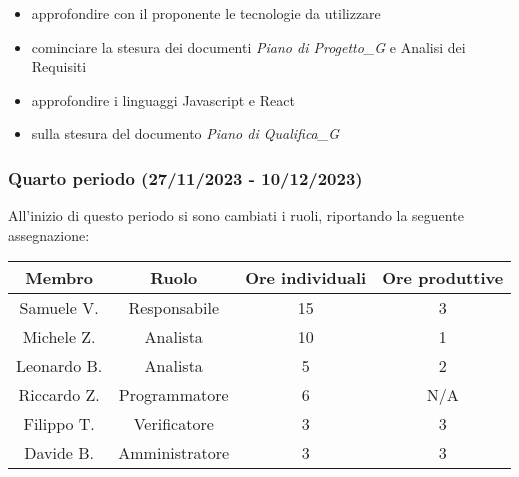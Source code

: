 \begin{itemize}
    \item approfondire con il proponente le tecnologie da utilizzare
    \item cominciare la stesura dei documenti \textit{Piano di Progetto_G} e Analisi dei Requisiti
    \item approfondire i linguaggi Javascript e React
\end{itemize}

\begin{itemize}
    \item sulla stesura del documento \textit{Piano di Qualifica_G}
\end{itemize}

\subsubsection{Quarto periodo (27/11/2023 - 10/12/2023)}
All'inizio di questo periodo si sono cambiati i ruoli, riportando la seguente assegnazione:

\vspace{10 mm}
\begin{tabular}{|c|c|c|c|}
\hline
\textbf{Membro} & \textbf{Ruolo} & \textbf{Ore individuali} & \textbf{Ore produttive} \\
\hline
Samuele V. & Responsabile & 15 & 3 \\
\hline
Michele Z. & Analista & 10 & 1 \\
\hline
Leonardo B. & Analista & 5 & 2 \\
\hline
Riccardo Z. & Programmatore & 6 & N/A \\
\hline
Filippo T. & Verificatore & 3 & 3 \\
\hline
Davide B. & Amministratore & 3 & 3 \\
\hline
\end{tabular}
\vspace{10 mm}

